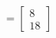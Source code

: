 \documentclass[preview]{standalone}
\begin{document}
\begin{align*}
= \begin{bmatrix} 8 \\ 18 \end{bmatrix}
\end{align*}
\end{document}
